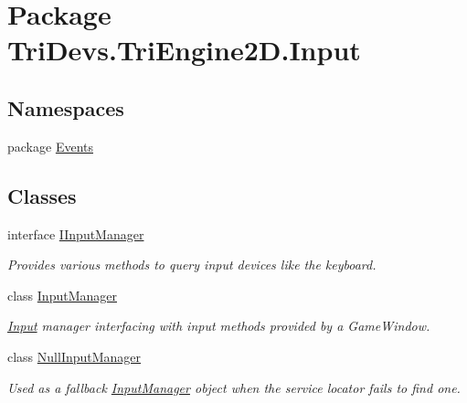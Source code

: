 \hypertarget{namespace_tri_devs_1_1_tri_engine2_d_1_1_input}{\section{Package Tri\-Devs.\-Tri\-Engine2\-D.\-Input}
\label{namespace_tri_devs_1_1_tri_engine2_d_1_1_input}
}
\subsection*{Namespaces}
\begin{DoxyCompactItemize}
\item 
package \hyperlink{namespace_tri_devs_1_1_tri_engine2_d_1_1_input_1_1_events}{Events}
\end{DoxyCompactItemize}
\subsection*{Classes}
\begin{DoxyCompactItemize}
\item 
interface \hyperlink{interface_tri_devs_1_1_tri_engine2_d_1_1_input_1_1_i_input_manager}{I\-Input\-Manager}
\begin{DoxyCompactList}\small\item\em Provides various methods to query input devices like the keyboard. \end{DoxyCompactList}\item 
class \hyperlink{class_tri_devs_1_1_tri_engine2_d_1_1_input_1_1_input_manager}{Input\-Manager}
\begin{DoxyCompactList}\small\item\em \hyperlink{namespace_tri_devs_1_1_tri_engine2_d_1_1_input}{Input} manager interfacing with input methods provided by a Game\-Window. \end{DoxyCompactList}\item 
class \hyperlink{class_tri_devs_1_1_tri_engine2_d_1_1_input_1_1_null_input_manager}{Null\-Input\-Manager}
\begin{DoxyCompactList}\small\item\em Used as a fallback \hyperlink{class_tri_devs_1_1_tri_engine2_d_1_1_input_1_1_input_manager}{Input\-Manager} object when the service locator fails to find one. \end{DoxyCompactList}\end{DoxyCompactItemize}
